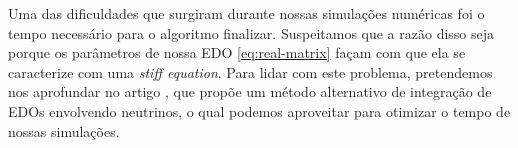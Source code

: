 \documentclass[12pt]{report}
\begin{document}
Uma das dificuldades que surgiram durante nossas simulações numéricas foi o tempo necessário para o algoritmo finalizar. Suspeitamos que a razão disso seja porque os parâmetros de nossa EDO \ref{eq:real-matrix} façam com que ela se caracterize com uma \textit{stiff equation}. Para lidar com este problema, pretendemos nos aprofundar no artigo \cite{efficient-nu}, que propõe um método alternativo de integração de EDOs envolvendo neutrinos, o qual podemos aproveitar para otimizar o tempo de nossas simulações.


%



\end{document}
